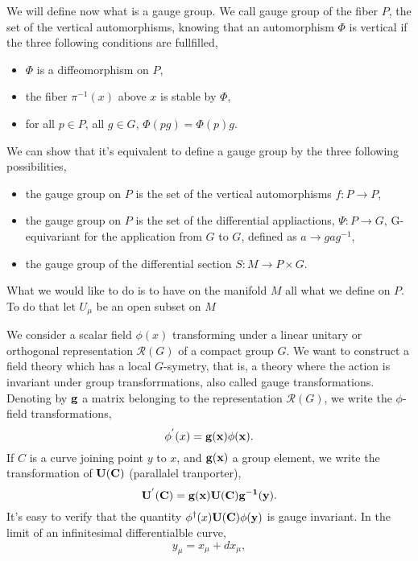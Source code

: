 \documentclass[a4paper,11pt]{article} %
\numberwithin{equation}{section} %
\numberwithin{figure}{section} %
\theoremstyle{plain} %
\theoremstyle{definition} %
\theoremstyle{remark} %
\begin{document}
\noindent
We will define now what is a gauge group. We call gauge group of the fiber $P$, the set of the vertical automorphisms, knowing that an automorphism $\Phi$ is vertical if the three following conditions are fullfilled,
\begin{itemize}
 \item $\Phi$ is a diffeomorphism on $P$,
 \item the fiber $\pi^{-1}(x)$ above $x$ is stable by $\Phi$,
 \item for all $p \in P$, all $g \in G$, $\Phi(pg) = \Phi(p)g$.
\end{itemize}
We can show that it's equivalent to define a gauge group by the three following possibilities,
\begin{itemize}
 \item the gauge group on $P$ is the set of the vertical automorphisms $f : P \rightarrow P$,
 \item the gauge group on $P$ is the set of the differential appliactions, $\Psi : P \rightarrow G$, G-equivariant for the application from $G$ to $G$, defined as $a \rightarrow g a g^{-1}$,
 \item the gauge group of the differential section $S : M \rightarrow P \times G$.
\end{itemize}

\noindent
What we would like to do is to have on the manifold $M$ all what we define on $P$. To do that let $U_\mu$ be an open subset on $M$



\noindent
We consider a scalar field $\phi(x)$ transforming under a linear unitary or orthogonal representation $\mathcal{R}(G)$ of a compact group $G$. We want to construct a field theory which has a local $G$-symetry, that is, a theory where the action is invariant under group transforrmations, also called gauge transformations. Denoting by $\bf{g}$ a matrix belonging to the representation $\mathcal{R}(G)$, we write the $\phi$-field transformations,
\begin{equation*}
 \phi^{'}(x) = \bf{g}(x) \phi(x) .
\end{equation*}
If $C$ is a curve joining point $y$ to $x$, and $\bf{g}(x)$  a group element, we write the transformation of $\bf{U}(C)$ (parallalel tranporter),
\begin{equation*}
 \bf{U}^{'}(C) = \bf{g}(x) \bf{U}(C) \bf{g}^{-1}(y). 
\end{equation*}
It's easy to verify that the quantity $\phi^{\dagger}(x) \bf{U}(C) \phi(y)$ is gauge invariant. In the limit of an infinitesimal differentialble curve,
\begin{equation*}
 y_{\mu} = x_{\mu} + dx_{\mu},
\end{equation*}
\end{document}
